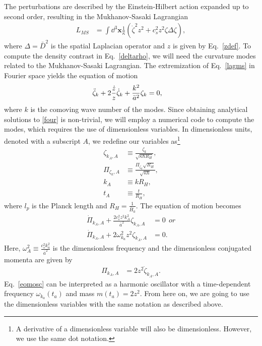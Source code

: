 \documentclass[a4paper,11pt]{article}
\begin{document}
The perturbations are described by the Einstein-Hilbert action expanded up to second order, resulting in the Mukhanov-Sasaki Lagrangian
\begin{align}
	\label{lagms}
	L_{MS} & = \int \dd^3\textbf{x} \frac{1}{ \kappa} \left({\dot{\zeta}}^2 z^2 + c_s^2 z^2 \zeta\Delta \zeta\right)
	,\end{align}
where $\Delta = \bar{D}^2$ is the spatial Laplacian operator and $z$ is given by Eq.~\eqref{zdef}.
To compute the density contrast in Eq.~\eqref{deltarho}, we will need the curvature modes related to the Mukhanov-Sasaki Lagrangian. The extremization of Eq.~\eqref{lagms} in Fourier space yields the equation of motion
\begin{align}
	\label{four}
	\Ddot{\zeta}_{k}+ 2\frac{ \dot{z} }{ z } \dot{\zeta}_k + \frac{k^2}{\bar{a}^2} \zeta_k & =0
	,\end{align}
where $k$ is the comoving wave number of the modes. Since obtaining analytical solutions to \eqref{four} is non-trivial, we will employ a numerical code to compute the modes, which requires the use of dimensionless variables. In dimensionless units, denoted with a subscript $A$, we redefine our variables as\footnote{A derivative of a dimensionless variable will also be dimensionless. However, we use the same dot notation.}
\begin{align}
	\zeta_{k_A, A}   & \equiv \frac{\zeta_{k}}{\sqrt{ \kappa \hbar R_H}},           \\
	\Pi_{\zeta_k, A} & \equiv \frac{\Pi_{\zeta_k} \sqrt{R_H}}{\sqrt{\kappa \hbar}}, \\
	\label{kadm}
	k_A              & \equiv k R_H,                                                \\
	t_A              & \equiv \frac{t}{R_H}
	,\end{align}
where $l_p$ is the Planck length and $R_H = \frac{1}{\bar{H}_0}$. The equation of motion becomes
\begin{align}
	\label{eomosc}
	\dot{\Pi}_{k_A, A}+  \frac{2 c^2_s z^2 k_A^2}{\bar{a}^2  } \zeta_{k_A, A} & =0 \nonumber~~ or \\
	\dot{\Pi}_{k_A, A}+  2 \omega_{k_a}^2 z^2  \zeta_{k_A, A}                 & =0
	.\end{align}
Here, $\omega_A^2 \equiv \frac{c_s^2 k_a^2}{\bar{a}^2}$ is the dimensionless frequency and the dimensionless conjugated momenta are given by
\begin{align}
	\Pi_{k_A, A} & = 2 z^2 \dot{\zeta}_{k_A, A}
	.\end{align}
Eq.~\eqref{eomosc} can be interpreted as a harmonic oscillator with a time-dependent frequency $\omega_{k_a}(t_a)$ and mass $m(t_a) = 2z^2$. From here on, we are going to use the dimensionless variables with the same notation as described above.
\end{document}
